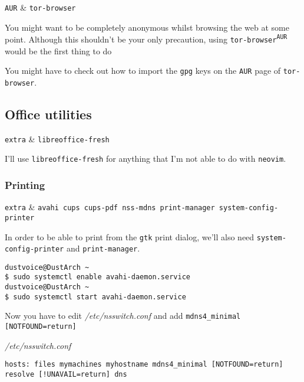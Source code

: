 \documentclass[10pt]{dustdoc}
\begin{document}
\begin{packagetable}
    \texttt{AUR} & \texttt{tor-browser} \\ 
\end{packagetable}

You might want to be completely anonymous whilst browsing the web at some point.
Although this shouldn’t be your only precaution, using \texttt{tor-browser\textsuperscript{\texttt{AUR}}} would be the first thing to do

\begin{NOTE}
    You might have to check out how to import the \texttt{gpg} keys on the \texttt{AUR} page of \texttt{tor-browser}.
\end{NOTE}

\subsection{Office utilities}
\label{sec:office-utilities}

\begin{packagetable}
    \texttt{extra} & \texttt{libreoffice-fresh} \\ 
\end{packagetable}

I’ll use \texttt{libreoffice-fresh} for anything that I’m not able to do with \texttt{neovim}.

\subsubsection{Printing}
\label{sec:printing}

\begin{packagetable}
    \texttt{extra} & \texttt{avahi cups cups-pdf nss-mdns print-manager system-config-printer} \\ 
\end{packagetable}

In order to be able to print from the \texttt{gtk} print dialog, we’ll also need \texttt{system-config-printer} and \texttt{print-manager}.

\begin{verbatim}
dustvoice@DustArch ~
$ sudo systemctl enable avahi-daemon.service
dustvoice@DustArch ~
$ sudo systemctl start avahi-daemon.service
\end{verbatim}

Now you have to edit \textit{/etc/nsswitch.conf} and add \texttt{mdns4\_minimal [NOTFOUND=return]}

\begin{mintedlisting}
    \caption*{\textit{/etc/nsswitch.conf}}
    \begin{verbatim}
hosts: files mymachines myhostname mdns4_minimal [NOTFOUND=return] resolve [!UNAVAIL=return] dns
    \end{verbatim}
\end{mintedlisting}
\end{document}
